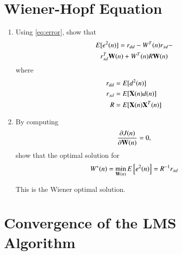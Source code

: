 \documentclass[journal,12pt,twocolumn]{IEEEtran}
\renewcommand\thesection{\arabic{section}}
\begin{document}
\section{Wiener-Hopf Equation}
\begin{enumerate}[label=\thesection.\arabic*
,ref=\thesection.\theenumi]

\item Using \eqref{eq:error}, 
%
show that
\begin{multline}
E[e^{2}(n)] = r_{dd} - W^{T}(n)r_{xd} - 
\\
r^{T}_{xd}\mathbf{W}(n) + W^{T}(n) R \mathbf{W}(n)
\end{multline}
where
\begin{align}
r_{dd} &= E[d^2(n)]
\\
r_{xd} &= E[\mathbf{X}(n)d(n)]
\\
R &= E[\mathbf{X}(n)\mathbf{X}^{T}(n)]
\label{eq:matrix_R}
\end{align}

%
\item
By computing 
\begin{equation}
\frac{\partial J(n)}{\partial \mathbf{W}(n)}=0,
\end{equation}
show that the optimal solution for
%
\begin{equation}
\label{eq:wiener_opt}
W^*(n) = \min_{\mathbf{W}(n)}E{}\left[e^2(n)\right] = R^{-1} r_{xd}
\end{equation}
%

This is the Wiener optimal solution.
\end{enumerate}
\section{Convergence of the LMS Algorithm}
\end{document}
